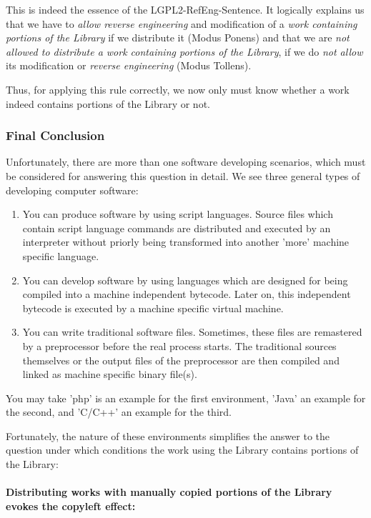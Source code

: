 This is indeed the essence of the LGPL2-RefEng-Sentence. It logically explains
us that we have to \emph{allow reverse engineering} and modification of a
\emph{work containing portions of the Library} if we distribute it (Modus
Ponens) and that we are \emph{not allowed to distribute a work containing
portions of the Library}, if we do \emph{not allow} its modification or
\emph{reverse engineering} (Modus Tollens).

Thus, for applying this rule correctly, we now only must know whether a work
indeed contains portions of the Library or not.

\subsubsection{Final Conclusion}

Unfortunately, there are more than one software developing scenarios, which must
be considered for answering this question in detail. We see three general types
of developing computer software:

\begin{enumerate}
  \item You can produce software by using script languages. Source files which
  contain script language commands are distributed and executed by an
  interpreter without priorly being transformed into another 'more' machine
  specific language.
  \item You can develop software by using languages which are designed for being
  compiled into a machine independent bytecode. Later on, this independent
  bytecode is executed by a machine specific virtual machine.
  \item You can write traditional software files. Sometimes, these files are
  remastered by a preprocessor before the real process starts. The traditional
  sources themselves or the output files of the preprocessor are then compiled
  and linked as machine specific binary file(s).
\end{enumerate}
  
You may take 'php' is an example for the first environment, 'Java' an example
for the second, and 'C/C++' an example for the third.

Fortunately, the nature of these environments simplifies the answer to the
question under which conditions the work using the Library contains portions of
the Library:

\paragraph{Distributing works with manually copied portions of the Library
evokes the copyleft effect:}

